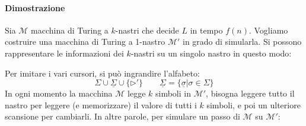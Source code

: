 \paragraph{Dimostrazione} Sia $\mathcal{M}$ macchina di Turing a $k$-nastri che decide $L$ in tempo $f(n)$. Vogliamo costruire una macchina di Turing a 1-nastro $\mathcal{M}'$ in grado di simularla. Si possono rappresentare le informazioni dei $k$-nastri su un singolo nastro in questo modo:
\begin{center}
\end{center}
Per imitare i vari cursori, si può ingrandire l'alfabeto:
$$
    \Sigma \cup \underline{\Sigma} \cup \{\rhd'\}
    \qquad 
    \underline{\Sigma} = \{ \underline{\sigma}|\sigma\in\Sigma \}
$$
In ogni momento la macchina $\mathcal{M}$ legge $k$ simboli in $\mathcal{M}'$, bisogna leggere tutto il nastro per leggere (e memorizzare) il valore di tutti i $k$ simboli, e poi un ulteriore scansione per cambiarli. In altre parole, per simulare un passo di $\mathcal{M}$ su $\mathcal{M}'$:
